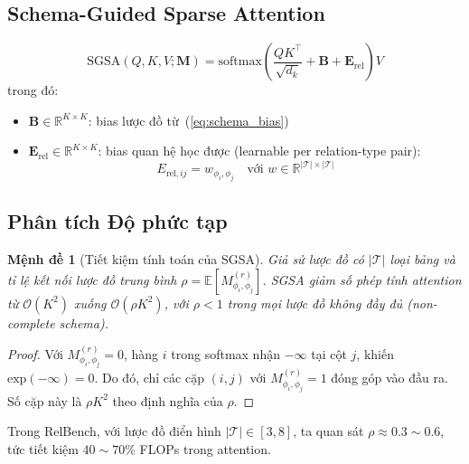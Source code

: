 \documentclass[12pt,a4paper]{article}
\newtheorem{proposition}[theorem]{Mệnh đề}
\begin{document}
\subsection{Schema-Guided Sparse Attention}

\begin{mathbox}[title={Công thức SGSA}]
\begin{equation}
  \text{SGSA}(Q, K, V; \mathbf{M}) =
  \text{softmax}\!\left(\frac{QK^\top}{\sqrt{d_k}} + \mathbf{B} + \mathbf{E}_\text{rel}\right) V
  \label{eq:sgsa}
\end{equation}
trong đó:
\begin{itemize}[nosep]
  \item $\mathbf{B} \in \mathbb{R}^{K \times K}$: bias lược đồ từ~(\ref{eq:schema_bias})
  \item $\mathbf{E}_\text{rel} \in \mathbb{R}^{K \times K}$: bias quan hệ học được
        (learnable per relation-type pair):
        \[
          E_{\text{rel},ij} = w_{\phi_i, \phi_j}
          \quad \text{với } w \in \mathbb{R}^{|\mathcal{T}| \times |\mathcal{T}|}
        \]
\end{itemize}
\end{mathbox}

\subsection{Phân tích Độ phức tạp}

\begin{proposition}[Tiết kiệm tính toán của SGSA]
Giả sử lược đồ có $|\mathcal{T}|$ loại bảng và tỉ lệ kết nối lược đồ
trung bình $\rho = \mathbb{E}[M^{(r)}_{\phi_i,\phi_j}]$. SGSA giảm số
phép tính attention từ $\mathcal{O}(K^2)$ xuống $\mathcal{O}(\rho K^2)$,
với $\rho < 1$ trong mọi lược đồ không đầy đủ (non-complete schema).
\end{proposition}

\begin{proof}
Với $M^{(r)}_{\phi_i,\phi_j} = 0$, hàng $i$ trong softmax nhận $-\infty$
tại cột $j$, khiến $\text{exp}(-\infty) = 0$. Do đó, chỉ các cặp
$(i,j)$ với $M^{(r)}_{\phi_i,\phi_j} = 1$ đóng góp vào đầu ra.
Số cặp này là $\rho K^2$ theo định nghĩa của $\rho$.
\end{proof}

Trong RelBench, với lược đồ điển hình $|\mathcal{T}| \in [3,8]$, ta quan sát
$\rho \approx 0.3 \sim 0.6$, tức tiết kiệm $40\sim70\%$ FLOPs trong attention.

\end{document}
